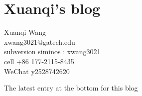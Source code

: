 


\chapter{Xuanqi's blog}
\label{chap:blogXW}
\renewcommand{\Ssym}[1]{{\ensuremath{m_{#1}}}}    %
\renewcommand{\Refl}{\ensuremath{{\sigma}}} %
\renewcommand{\shift}{\ensuremath{r}}
\renewcommand{\ssp}{\ensuremath{\phi}}             %

	
{\large Xuanqi Wang}\\
xwang3021@gatech.edu\\
subversion siminos : xwang3021 \\ %
cell +86 177-2115-8435 \\
\hfill   WeChat  y2528742620

\hfill   {\color{red} The latest entry at the bottom for this blog}
\bigskip

\bigskip

